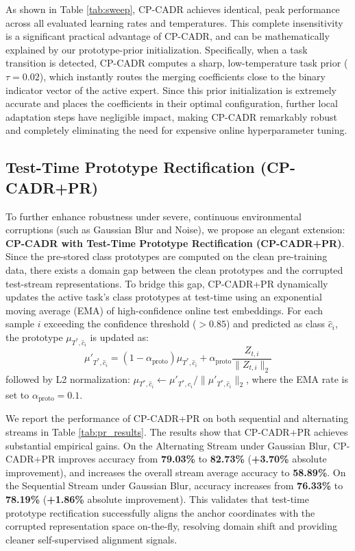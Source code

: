 \documentclass{article}
\theoremstyle{plain}
\theoremstyle{definition}
\theoremstyle{remark}
\begin{document}
As shown in Table \ref{tab:sweep}, CP-CADR achieves identical, peak performance across all evaluated learning rates and temperatures. This complete insensitivity is a significant practical advantage of CP-CADR, and can be mathematically explained by our prototype-prior initialization. Specifically, when a task transition is detected, CP-CADR computes a sharp, low-temperature task prior ($\tau = 0.02$), which instantly routes the merging coefficients close to the binary indicator vector of the active expert. Since this prior initialization is extremely accurate and places the coefficients in their optimal configuration, further local adaptation steps have negligible impact, making CP-CADR remarkably robust and completely eliminating the need for expensive online hyperparameter tuning.

\subsection{Test-Time Prototype Rectification (CP-CADR+PR)}
\label{sec:app_pr}
To further enhance robustness under severe, continuous environmental corruptions (such as Gaussian Blur and Noise), we propose an elegant extension: \textbf{CP-CADR with Test-Time Prototype Rectification (CP-CADR+PR)}. 
Since the pre-stored class prototypes are computed on the clean pre-training data, there exists a domain gap between the clean prototypes and the corrupted test-stream representations. To bridge this gap, CP-CADR+PR dynamically updates the active task's class prototypes at test-time using an exponential moving average (EMA) of high-confidence online test embeddings. For each sample $i$ exceeding the confidence threshold ($>0.85$) and predicted as class $\hat{c}_i$, the prototype $\mu_{T^*, \hat{c}_i}$ is updated as:
\begin{equation}
    \mu'_{T^*, \hat{c}_i} = (1 - \alpha_{\text{proto}}) \mu_{T^*, \hat{c}_i} + \alpha_{\text{proto}} \frac{Z_{t,i}}{\|Z_{t,i}\|_2}
\end{equation}
followed by L2 normalization: $\mu_{T^*, \hat{c}_i} \leftarrow \mu'_{T^*, \hat{c}_i} / \|\mu'_{T^*, \hat{c}_i}\|_2$, where the EMA rate is set to $\alpha_{\text{proto}} = 0.1$.

We report the performance of CP-CADR+PR on both sequential and alternating streams in Table \ref{tab:pr_results}.
The results show that CP-CADR+PR achieves substantial empirical gains. On the Alternating Stream under Gaussian Blur, CP-CADR+PR improves accuracy from \textbf{79.03\%} to \textbf{82.73\%} (\textbf{+3.70\%} absolute improvement), and increases the overall stream average accuracy to \textbf{58.89\%}. On the Sequential Stream under Gaussian Blur, accuracy increases from \textbf{76.33\%} to \textbf{78.19\%} (\textbf{+1.86\%} absolute improvement). This validates that test-time prototype rectification successfully aligns the anchor coordinates with the corrupted representation space on-the-fly, resolving domain shift and providing cleaner self-supervised alignment signals.
\end{document}
